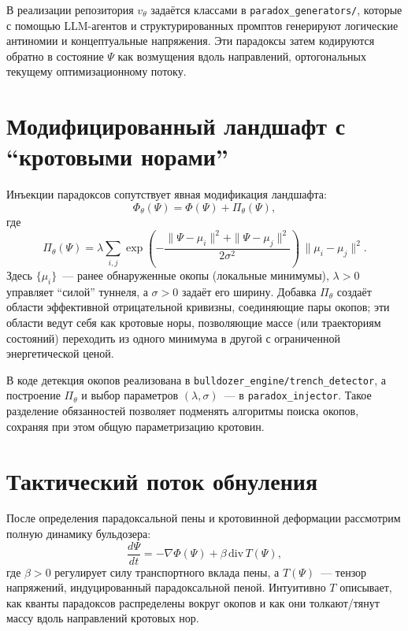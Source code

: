 \documentclass[11pt]{article}
\begin{document}
В реализации репозитория $v_{\theta}$ задаётся классами в \texttt{paradox\_generators/}, которые с помощью LLM-агентов и структурированных промптов генерируют логические антиномии и концептуальные напряжения. 
Эти парадоксы затем кодируются обратно в состояние $\Psi$ как возмущения вдоль направлений, ортогональных текущему оптимизационному потоку.

\section{Модифицированный ландшафт с ``кротовыми норами''}

Инъекции парадоксов сопутствует явная модификация ландшафта:
\begin{equation}
    \Phi_{\theta}(\Psi) = \Phi(\Psi) + \Pi_{\theta}(\Psi),
\end{equation}
где
\begin{equation}
    \Pi_{\theta}(\Psi)
    = \lambda \sum_{i,j} 
    \exp\left(
    - \frac{\|\Psi - \mu_i\|^2 + \|\Psi - \mu_j\|^2}{2\sigma^2}
    \right) 
    \, \|\mu_i - \mu_j\|^2.
\end{equation}
Здесь $\{\mu_i\}$~--- ранее обнаруженные окопы (локальные минимумы), $\lambda > 0$ управляет ``силой'' туннеля, а $\sigma > 0$ задаёт его ширину. 
Добавка $\Pi_{\theta}$ создаёт области эффективной отрицательной кривизны, соединяющие пары окопов; эти области ведут себя как кротовые норы, позволяющие массе (или траекториям состояний) переходить из одного минимума в другой с ограниченной энергетической ценой.

В коде детекция окопов реализована в \texttt{bulldozer\_engine/trench\_detector}, а построение $\Pi_{\theta}$ и выбор параметров $(\lambda,\sigma)$~--- в \texttt{paradox\_injector}. 
Такое разделение обязанностей позволяет подменять алгоритмы поиска окопов, сохраняя при этом общую параметризацию кротовин.

\section{Тактический поток обнуления}

После определения парадоксальной пены и кротовинной деформации рассмотрим полную динамику бульдозера:
\begin{equation}
    \frac{d\Psi}{dt} 
    = - \nabla \Phi(\Psi) + \beta \, \mathrm{div} \, T(\Psi),
\end{equation}
где $\beta > 0$ регулирует силу транспортного вклада пены, а $T(\Psi)$~--- тензор напряжений, индуцированный парадоксальной пеной. 
Интуитивно $T$ описывает, как кванты парадоксов распределены вокруг окопов и как они толкают/тянут массу вдоль направлений кротовых нор.
\end{document}
